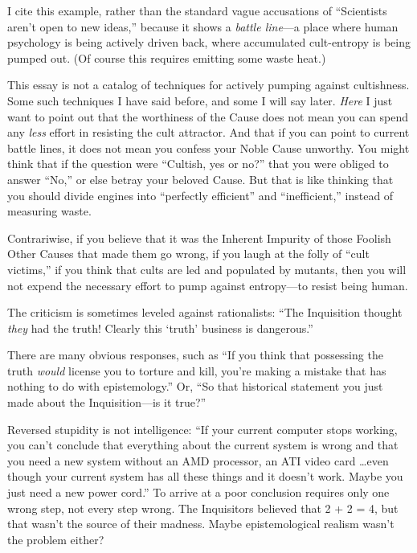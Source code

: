 {
 I cite this example, rather than the standard vague accusations of
``Scientists aren't open to new
ideas,'' because it shows a \textit{battle
line}{}---a place where human psychology is being actively driven back,
where accumulated cult-entropy is being pumped out. (Of course this
requires emitting some waste heat.)}

{
 This essay is not a catalog of techniques for actively pumping
against cultishness. Some such techniques I have said before, and some
I will say later. \textit{Here} I just want to point out that the
worthiness of the Cause does not mean you can spend any \textit{less}
effort in resisting the cult attractor. And that if you can point to
current battle lines, it does not mean you confess your Noble Cause
unworthy. You might think that if the question were
``Cultish, yes or no?'' that you
were obliged to answer ``No,'' or
else betray your beloved Cause. But that is like thinking that you
should divide engines into ``perfectly
efficient'' and
``inefficient,'' instead of
measuring waste.}

{
 Contrariwise, if you believe that it was the Inherent Impurity of
those Foolish Other Causes that made them go wrong, if you laugh at the
folly of ``cult victims,'' if you
think that cults are led and populated by mutants, then you will not
expend the necessary effort to pump against entropy---to resist being
human.}

\myendsectiontext


{
 The criticism is sometimes leveled against rationalists:
``The Inquisition thought \textit{they} had the truth!
Clearly this `truth' business is
dangerous.'' }

{
 There are many obvious responses, such as ``If
you think that possessing the truth \textit{would} license you to
torture and kill, you're making a mistake that has
nothing to do with epistemology.'' Or,
``So that historical statement you just made about the
Inquisition---is it true?''}

{
 Reversed stupidity is not intelligence: ``If your
current computer stops working, you can't conclude that
everything about the current system is wrong and that you need a new
system without an AMD processor, an ATI video card \ldots even though
your current system has all these things and it doesn't
work. Maybe you just need a new power cord.'' To
arrive at a poor conclusion requires only one wrong step, not every
step wrong. The Inquisitors believed that 2 + 2 = 4, but that
wasn't the source of their madness. Maybe
epistemological realism wasn't the problem either?}

